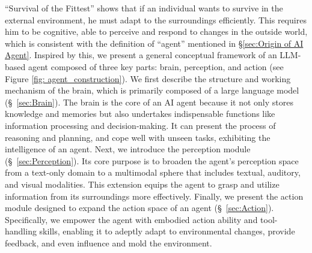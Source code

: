 ``Survival of the Fittest'' \cite{darwin1859origin} shows that if an individual wants to survive in the external environment, he must adapt to the surroundings efficiently. 
This requires him to be cognitive, able to perceive and respond to changes in the outside world, which is consistent with the definition of ``agent'' mentioned in \S \ref{sec:Origin of AI Agent}. 
Inspired by this, we present a general conceptual framework of an LLM-based agent composed of three key parts: brain, perception, and action (see Figure \ref{fig: agent_construction}). 
We first describe the structure and working mechanism of the brain, which is primarily composed of a large language model (\S \ \ref{sec:Brain}). The brain is the core of an AI agent because it not only stores knowledge and memories but also undertakes indispensable functions like information processing and decision-making. It can present the process of reasoning and planning, and cope well with unseen tasks, exhibiting the intelligence of an agent. 
Next, we introduce the perception module (\S \ \ref{sec:Perception}). Its core purpose is to broaden the agent's perception space from a text-only domain to a multimodal sphere that includes textual, auditory, and visual modalities. This extension equips the agent to grasp and utilize information from its surroundings more effectively. 
Finally, we present the action module designed to expand the action space of an agent (\S \ \ref{sec:Action}). Specifically, we empower the agent with embodied action ability and tool-handling skills, enabling it to adeptly adapt to environmental changes, provide feedback, and even influence and mold the environment.

